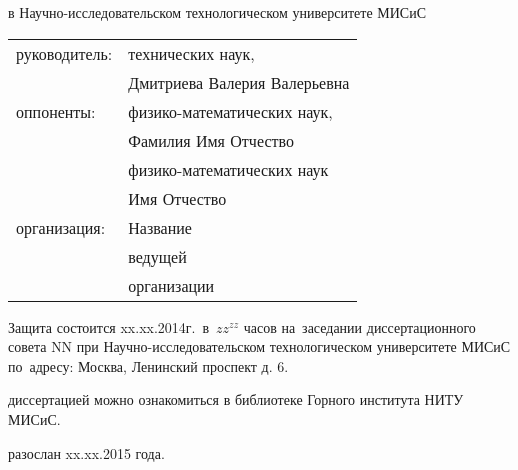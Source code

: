  в Научно-исследовательском технологическом университете МИСиС
\vspace{10mm}
\begin{table} [h]  
  \begin{tabular}{ll}
  \fontsize{14pt}{15pt} руководитель: & \fontsize{14pt}{15pt} технических наук,          \\
                        & \fontsize{14pt}{15pt} Дмитриева Валерия Валерьевна
\vspace{3mm} \\
  \fontsize{14pt}{15pt} оппоненты:& \fontsize{14pt}{15pt} физико-математических наук,  \\
                        & \fontsize{14pt}{15pt} Фамилия Имя Отчество \vspace{1mm}                         \\
                        & \fontsize{14pt}{15pt} физико-математических наук                                 \\
                        & \fontsize{14pt}{15pt} Имя Отчество \vspace{3mm}                                   \\
  \fontsize{14pt}{15pt} организация:  & \fontsize{14pt}{15pt}\selectfont Название                           \\
                        & \fontsize{14pt}{15pt}\selectfont ведущей                                                            \\
                        & \fontsize{14pt}{15pt}\selectfont организации
  \end{tabular}  
\end{table}

\vspace{20mm}
\noindent Защита состоится  xx.xx.2014г.~в~$zz^{zz}$ часов на~заседании диссертационного совета $\mbox{NN}$ при Научно-исследовательском технологическом университете МИСиС по~адресу: Москва, Ленинский проспект д. 6.

\vspace{15mm}
 диссертацией можно ознакомиться в библиотеке Горного института НИТУ МИСиС.

\vspace{15mm}
 разослан xx.xx.2015 года.

